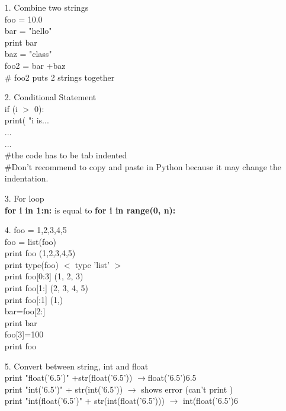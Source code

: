 \documentclass[11pt, oneside]{article}   	%
\begin{document}
\begin{enumerate}
\item[1.] Combine two strings \\
foo = 10.0\\
bar = "hello" \\
print bar \\
baz = "class" \\
foo2 = bar +baz \\
\# foo2 puts 2 strings together \\
\item[2.] Conditional Statement\\
if (i $>$ 0):\\
\indent[tab] print( "i is... \\
\indent[tab]	...\\
\indent[tab]	...\\
\#the code has to be tab indented\\
\#Don't recommend to copy and paste in Python because it may change the indentation. 
\item[3.] For loop\\
\textbf{for i in 1:n:} is equal to  \textbf{for i in range(0, n):}\\
\item[4.]
foo = 1,2,3,4,5 \\
foo = list(foo)\\
print foo \qquad(1,2,3,4,5)\\ 
print type(foo) \qquad $<$ type 'list' $>$ \\  
print foo[0:3] \qquad (1, 2, 3)\\	
print foo[1:]  \qquad(2, 3, 4, 5) \\
print foo[:1]  \qquad (1,)\\
bar=foo[2:]\\
print bar \qquad [3, 4, 5]\\
foo[3]=100\\
print foo \qquad [1, 2, 3, 100, 5]\\
\item[5.] Convert between string, int and float\\
print "float('6.5')" +str(float('6.5'))  \qquad  $\rightarrow$float('6.5')6.5\\
print "int('6.5')" + str(int('6.5')) \qquad $\rightarrow$ shows error (can't print ) \\
print "int(float('6.5')" + str(int(float('6.5'))) \qquad  $\rightarrow$ int(float('6.5')6\\  
\end{enumerate}
\end{document}
